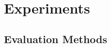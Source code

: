 \documentclass{beamer}
\begin{document}

\section[Experiments]{Experiments}

\subsection*{Evaluation Methods}
\end{document}
